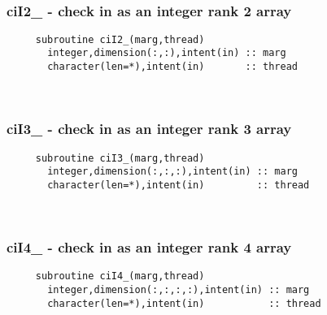  
\mbox{}\hrulefill\ 

  \subsubsection{ciI2\_ - check in as an integer rank 2 array}

\begin{verbatim} 
     subroutine ciI2_(marg,thread)
       integer,dimension(:,:),intent(in) :: marg
       character(len=*),intent(in)       :: thread
 \end{verbatim}%
 
 
\mbox{}\hrulefill\ 

  \subsubsection{ciI3\_ - check in as an integer rank 3 array}

\begin{verbatim} 
     subroutine ciI3_(marg,thread)
       integer,dimension(:,:,:),intent(in) :: marg
       character(len=*),intent(in)         :: thread
 \end{verbatim}%
 
 
\mbox{}\hrulefill\ 

  \subsubsection{ciI4\_ - check in as an integer rank 4 array}

\begin{verbatim} 
     subroutine ciI4_(marg,thread)
       integer,dimension(:,:,:,:),intent(in) :: marg
       character(len=*),intent(in)           :: thread
 \end{verbatim}%
 
